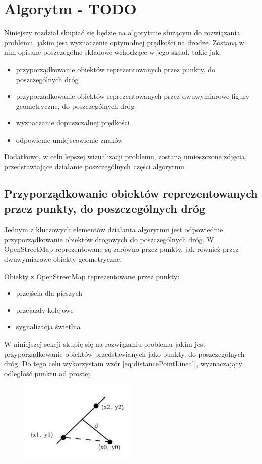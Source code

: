\chapter{Algorytm - TODO}
\label{cha:Algorytm}

Niniejszy rozdział skupiać się będzie na algorytmie służącym do rozwiązania problemu, jakim jest wyznaczenie optymalnej prędkości na drodze. Zostaną w nim opisane poszczególne składowe wchodzące w jego skład, takie jak:
\begin{itemize}
\item przyporządkowanie obiektów reprezentowanych przez punkty, do poszczególnych dróg
\item przyporządkowanie obiektów reprezentowanych przez dwuwymiarowe figury geometryczne, do poszczególnych dróg
\item wyznaczanie dopuszczalnej prędkości
\item odpowienie umiejscowienie znaków
\end{itemize}

Dodatkowo, w celu lepszej wizualizacji problemu, zostaną umieszczone zdjęcia, przedstawiające działanie poszczególnych części algorytmu.

\newpage
\section{Przyporządkowanie obiektów reprezentowanych przez punkty, do poszczególnych dróg}
\label{sec:ObiektyPunktDrogi}

Jednym z kluczowych elementów działania algorytmu jest odpowiednie przyporządkowanie obiektów drogowych do poszczególnych dróg. W OpenStreetMap reprezentowane są zarówno przez punkty, jak również przez dwuwymiarowe obiekty geometryczne.


Obiekty z OpenStreetMap reprezentowane przez punkty:
\begin{itemize}
\item przejścia dla pieszych
\item przejazdy kolejowe
\item sygnalizacja świetlna
\end{itemize}


W niniejszej sekcji skupię się na rozwiązaniu problemu jakim jest przyporządkowanie obiektów przedstawianych jako punkty, do poszczególnych dróg. Do tego celu wykorzystam wzór \ref{eq:distancePointLineal}, wyznaczający odległość punktu od prostej.

\begin{figure}[h]
\centering
\includegraphics[width=0.5\textwidth]{dlugoscPktOdProstej}
\end{figure}

